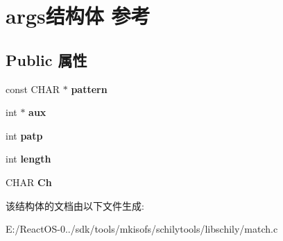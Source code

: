 \hypertarget{structargs}{}\section{args结构体 参考}
\label{structargs}
\subsection*{Public 属性}
\begin{DoxyCompactItemize}
\item 
\mbox{\label{structargs_a1c44992d7494e1b08472ba0c3241b8af}} 
const C\+H\+AR $\ast$ {\bfseries pattern}
\item 
\mbox{\label{structargs_acf603f598fe7fdb4a478b9bd68dc9394}} 
int $\ast$ {\bfseries aux}
\item 
\mbox{\label{structargs_a9b39fe654d5db22573c40b32d05151df}} 
int {\bfseries patp}
\item 
\mbox{\label{structargs_a4401fff3d3a574d1c7936435fbdac4ed}} 
int {\bfseries length}
\item 
\mbox{\label{structargs_a1025bbdd06a96cd0323e59b64c8a4f87}} 
C\+H\+AR {\bfseries Ch}
\end{DoxyCompactItemize}


该结构体的文档由以下文件生成\+:\begin{DoxyCompactItemize}
\item 
E\+:/\+React\+O\+S-\/0../sdk/tools/mkisofs/schilytools/libschily/match.\+c\end{DoxyCompactItemize}
